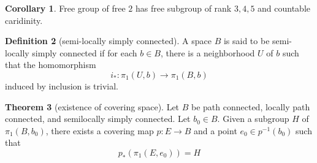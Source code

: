 \documentclass[12pt,a4paper]{book}
\theoremstyle{definition}
\newtheorem{defn}{Definition}[section]
\newtheorem{coro}[defn]{Corollary}
\newtheorem{theo}[defn]{Theorem}
\begin{document}
\begin{coro}
    Free group of free $2$ has free subgroup of rank $3,4,5$ and countable caridinity.
\end{coro}
\begin{defn}[semi-locally simply connected]
    A space $B$ is said to be semi-locally simply connected 
    if for each $b \in B$, there is a neighborhood $U$ of $b$ such that the homomorphism
    $$
        i_*: \pi_1(U, b) \rightarrow \pi_1(B, b)
    $$
    induced by inclusion is trivial.
\end{defn}
\begin{theo}[existence of covering space]
    Let $B$ be path connected, locally path connected, and semilocally simply connected. Let $b_0 \in B$.
    Given a subgroup $H$ of $\pi_1\left(B, b_0\right)$, there exists a covering map $p: E \rightarrow B$ and a point $e_0 \in p^{-1}\left(b_0\right)$ such that
    $$
        p_*\left(\pi_1\left(E, e_0\right)\right)=H
    $$
\end{theo}

\end{document}
